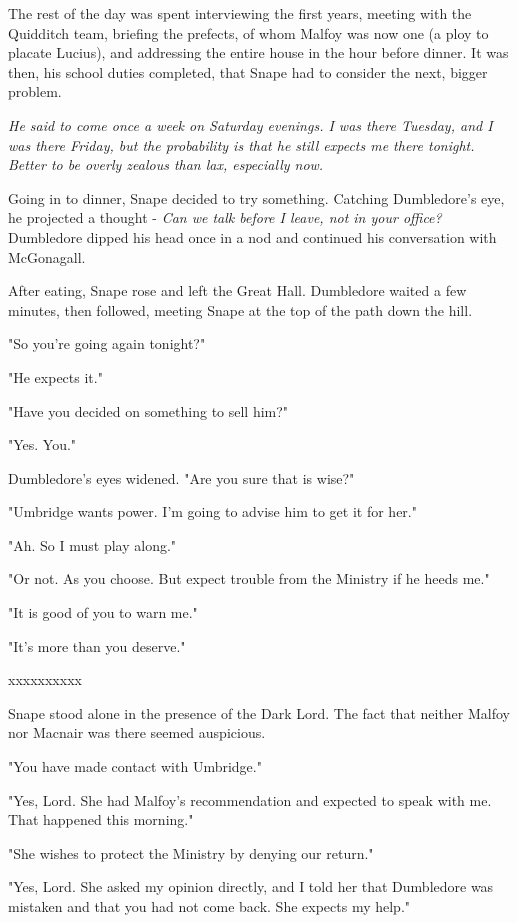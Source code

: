 \documentclass[a4paper,11pt]{article}
\begin{document}
The rest of the day was spent interviewing the first years, meeting with the Quidditch team, briefing the prefects, of whom Malfoy was now one (a ploy to placate Lucius), and addressing the entire house in the hour before dinner. It was then, his school duties completed, that Snape had to consider the next, bigger problem.

\emph{He said to come once a week on Saturday evenings. I was there Tuesday, and I was there Friday, but the probability is that he still expects me there tonight. Better to be overly zealous than lax, especially now.}

Going in to dinner, Snape decided to try something. Catching Dumbledore's eye, he projected a thought - \emph{Can we talk before I leave, not in your office?} Dumbledore dipped his head once in a nod and continued his conversation with McGonagall.

After eating, Snape rose and left the Great Hall. Dumbledore waited a few minutes, then followed, meeting Snape at the top of the path down the hill.

"So you're going again tonight?"

"He expects it."

"Have you decided on something to sell him?"

"Yes. You."

Dumbledore's eyes widened. "Are you sure that is wise?"

"Umbridge wants power. I'm going to advise him to get it for her."

"Ah. So I must play along."

"Or not. As you choose. But expect trouble from the Ministry if he heeds me."

"It is good of you to warn me."

"It's more than you deserve."

xxxxxxxxxx

Snape stood alone in the presence of the Dark Lord. The fact that neither Malfoy nor Macnair was there seemed auspicious.

"You have made contact with Umbridge."

"Yes, Lord. She had Malfoy's recommendation and expected to speak with me. That happened this morning."

"She wishes to protect the Ministry by denying our return."

"Yes, Lord. She asked my opinion directly, and I told her that Dumbledore was mistaken and that you had not come back. She expects my help."
\end{document}
